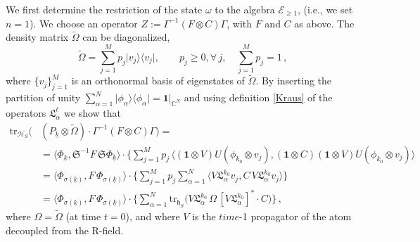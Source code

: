 \documentclass[a4paper,11pt]{article}
\begin{document}
 We first determine the restriction of the state $\omega$ to the algebra $\mathcal{E}_{\geq 1}$, (i.e., we set $n=1$). We choose an operator
 $Z:=\Gamma^{-1} (F\otimes C)\Gamma$, with $F$ and $C$ as above. The density matrix $\widetilde{\Omega}$ can be diagonalized,
 $$\widetilde{\Omega}= \sum_{j=1}^{M} p_j \vert v_j\rangle \langle v_j\vert, \qquad p_j \geq 0, \forall\, j, \quad
 \sum_{j=1}^{M}p_j =1\,,$$
 where $\big\{v_j \big\}_{j=1}^{M}$ is an orthonormal basis of eigenstates of $\widetilde{\Omega}$. 
 By inserting the partition of unity $\sum_{\alpha=1}^{N} \vert \phi_{\alpha} \rangle \langle \phi_{\alpha}\vert = \mathbf{1}\vert_{\mathbb{C}^{N}}$ and using definition \eqref{Kraus} of the operators $\mathfrak{L}_{\alpha}^{\ell}$ we show that
 \begin{align}\label{one step}
 \text{tr}_{\mathcal{H}_S}\big(&(P_{\underline{k}}\otimes \widetilde{\Omega})\cdot \Gamma^{-1}(F\otimes C)\Gamma\big) = \nonumber\\
& = \langle \Phi_{\underline{k}}, \mathfrak{S}^{-1} F\, \mathfrak{S} \Phi_{\underline{k}}\rangle \cdot \Big\{\sum_{j=1}^{M} p_{j}\,
\langle (\mathbf{1}\otimes V)U(\phi_{k_0}\otimes v_j), (\mathbf{1}\otimes C) (\mathbf{1}\otimes V) U(\phi_{k_0} \otimes v_j )\rangle\, \nonumber \\
& =\langle \Phi_{\sigma(\underline{k})}, F\,  \Phi_{\sigma(\underline{k})}\rangle \cdot \Big\{\sum_{j=1}^{M} p_{j} \sum_{\alpha=1}^{N} \langle V\mathfrak{L}_{\alpha}^{k_0} v_j, C\, V\mathfrak{L}_{\alpha}^{k_0} v_j \rangle\Big\} \nonumber \\
& = \langle \Phi_{\sigma(\underline{k})}, F\,  \Phi_{\sigma(\underline{k})}\rangle \cdot \Big\{\sum_{\alpha=1}^{N} 
\text{tr}_{\mathfrak{h}_S} \big(V\mathfrak{L}_{\alpha}^{k_0}\, \Omega\, [V\mathfrak{L}_{\alpha}^{k_0} ]^{*} \cdot C\big)\Big\}\,,
\end{align}
where $\Omega = \widetilde{\Omega}$ (at time $t=0$), and where $V$ is the $time$-1 propagator of the atom decoupled 
from the R-field.
\end{document}
